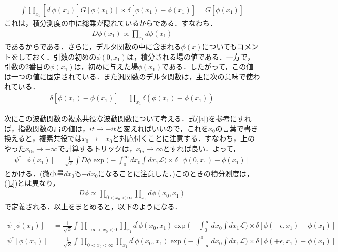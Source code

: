 \begin{align}
  \int\prod_{x_1}[d^{\prime}\phi(x_1)]G[\phi(x_1)]\times\delta[\phi(x_1)-\bar{\phi}(x_1)]=G[\bar\phi(x_1)]
\end{align}
これは，積分測度の中に総乗が隠れているからである．すなわち．
\begin{align}
  D\phi(x_1)\propto \prod_{x_1}d\phi(x_1)
\end{align}
であるからである．さらに，デルタ関数の中に含まれる$\phi(x)$についてもコメントをしておく．引数の初めの$\phi(0,x_1)$は，積分される場の値である．一方で，引数の2番目の$\phi(x_1)$は，初めに与えた場$\phi(x_1)$である．したがって，この値は一つの値に固定されている．また汎関数のデルタ関数は，主に次の意味で使われている．
\begin{eqnarray}
\delta[\phi(x_1)-\bar{\phi}(x_1)]=\prod_{x_1}\delta(\phi(x_1)-\bar{\phi}(x_1))
\end{eqnarray}

次にこの波動関数の複素共役な波動関数について考える．式(\ref{a})を参考にすれば，指数関数の肩の値は，$it \rightarrow -it$と変えればいいので，これを$x_0$の言葉で書き換えると，複素共役では$x_0 \rightarrow -x_0$と対応付くことに注意する．すなわち，上のやった$x_{0i}\to -\infty$で計算するトリックは，$x_{0i}\to \infty$とすれば良い．よって，
\begin{align}
  \psi^{*}[\phi(x_{1})]=\frac{1}{\sqrt{Z}} \int D\phi \exp\biggl(-\int_{0}^{\infty}dx_0\int dx_1\mathcal{L}\biggr)\times\delta[\phi(0,x_1)-\phi(x_1)]
\end{align}
とかける．(微小量$dx_0$も$-dx_0$になることに注意した．)このときの積分測度は，(\ref{b})とは異なり，
\begin{align}
  D\phi\propto \prod_{0<x_0<\infty}\prod_{x_1}d\phi(x_0,x_1)
\end{align}
で定義される．以上をまとめると，以下のようになる．

\begin{empheqboxed}

\begin{align}
\label{wave1}
  \psi[\phi(x_{1})]&=\frac{1}{\sqrt{Z}} \int \prod_{-\infty<x_0<0}\prod_{x_1}d^{\prime}\phi(x_0,x_1) \exp\biggl(-\int_{0}^{\infty}dx_0\int dx_1\mathcal{L}\biggr)\times\delta[\phi(-\epsilon,x_1)-\phi(x_1)] \\
  \label{wave2}
  \psi^{*}[\phi(x_{1})]&=\frac{1}{\sqrt{Z}} \int \prod_{0<x_0<\infty}\prod_{x_1}d^{\prime}\phi(x_0,x_1) \exp\biggl(-\int^{0}_{-\infty}dx_0\int dx_1\mathcal{L}\biggr)\times\delta[\phi(+\epsilon,x_1)-\phi(x_1)]
\end{align}

\end{empheqboxed}

